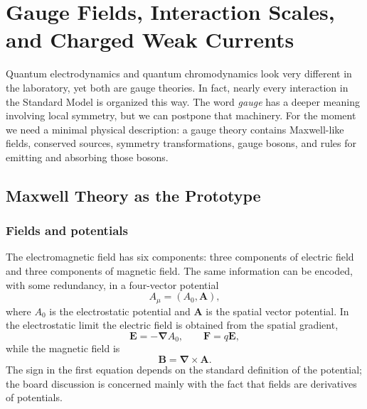 \chapter{Gauge Fields, Interaction Scales, and Charged Weak Currents}

Quantum electrodynamics and quantum chromodynamics look very different in the
laboratory, yet both are gauge theories. In fact, nearly every interaction in
the Standard Model is organized this way. The word \emph{gauge} has a deeper
meaning involving local symmetry, but we can postpone that machinery. For the
moment we need a minimal physical description: a gauge theory contains
Maxwell-like fields, conserved sources, symmetry transformations, gauge bosons,
and rules for emitting and absorbing those bosons.

\section{Maxwell Theory as the Prototype}

\subsection{Fields and potentials}

The electromagnetic field has six components: three components of electric
field and three components of magnetic field. The same information can be
encoded, with some redundancy, in a four-vector potential
\begin{equation}
A_\mu=(A_0,\boldsymbol A),
\end{equation}
where \(A_0\) is the electrostatic potential and \(\boldsymbol A\) is the
spatial vector potential. In the electrostatic limit the electric field is
obtained from the spatial gradient,
\begin{equation}
\boldsymbol E=-\boldsymbol\nabla A_0,
\qquad
\boldsymbol F=q\boldsymbol E,
\end{equation}
while the magnetic field is
\begin{equation}
\boldsymbol B=\boldsymbol\nabla\times\boldsymbol A.
\end{equation}
The sign in the first equation depends on the standard definition of the
potential; the board discussion is concerned mainly with the fact that fields
are derivatives of potentials.

